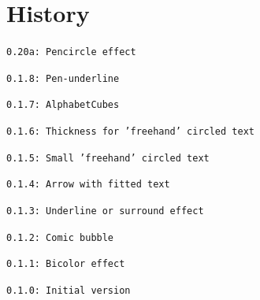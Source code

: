 \documentclass[11pt,a4paper]{ltxdoc}
\begin{document}
\begin{DemoCode}{}
\end{DemoCode}

\begin{DemoCode}{}
\end{DemoCode}

\pagebreak

\section{History}

\texttt{0.20a: Pencircle effect}

\texttt{0.1.8: Pen-underline}

\texttt{0.1.7: AlphabetCubes}

\texttt{0.1.6: Thickness for 'freehand' circled text}

\texttt{0.1.5: Small 'freehand' circled text}

\texttt{0.1.4: Arrow with fitted text}

\texttt{0.1.3: Underline or surround effect}

\texttt{0.1.2: Comic bubble}

\texttt{0.1.1: Bicolor effect}

\texttt{0.1.0: Initial version}
\end{document}
